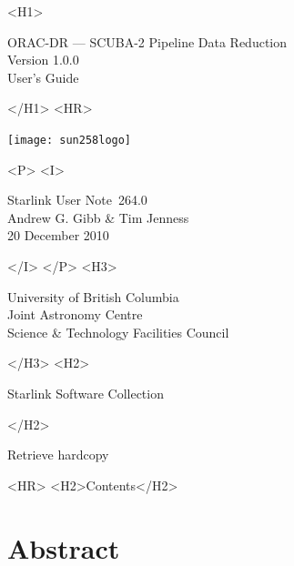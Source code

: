 \documentclass[twoside,11pt]{article}
\newcommand{\stardoccategory}  {Starlink User Note}
\newcommand{\stardocsource}    {sun\stardocnumber}
\newcommand{\stardocnumber}    {264.0}
\newcommand{\stardocauthors}   {Andrew G. Gibb \& Tim Jenness}
\newcommand{\stardocdate}      {20 December 2010}
\newcommand{\stardoctitle}     {ORAC-DR --- SCUBA-2 Pipeline Data Reduction}
\newcommand{\stardocversion}   {Version 1.0.0}
\newcommand{\stardocmanual}    {User's Guide}
\newcommand{\htmladdnormallink}[2]{#1}
\newcommand{\htmladdimg}[1]{}
\newcommand{\htmlref}[2]{#1}
\newcommand{\htmladdtonavigation}[1]{}
\newcommand{\xlabel}[1]{}
\renewcommand{\_}{\texttt{\symbol{95}}}
\begin{document}
\begin{htmlonly}
   \xlabel{}
   \begin{rawhtml} <H1> \end{rawhtml}
      \stardoctitle\\
      \stardocversion\\
      \stardocmanual
   \begin{rawhtml} </H1> <HR> \end{rawhtml}

\texttt{[image: sun258\_logo]}

   \begin{rawhtml} <P> <I> \end{rawhtml}
   \stardoccategory\ \stardocnumber \\
   \stardocauthors \\
   \stardocdate
   \begin{rawhtml} </I> </P> <H3> \end{rawhtml}
      \htmladdnormallink{University of British Columbia}
                        {http://www.ubc.ca} \\
      \htmladdnormallink{Joint Astronomy Centre}
                        {http://www.jach.hawaii.edu}\\
      \htmladdnormallink{Science \& Technology Facilities Council}
                        {http://www.stfc.ac.uk} \\
   \begin{rawhtml} </H3> <H2> \end{rawhtml}
      \htmladdnormallink{Starlink Software Collection}{http://starlink.jach.hawaii.edu/}
   \begin{rawhtml} </H2> \end{rawhtml}
   \htmladdnormallink{\htmladdimg{source.gif} Retrieve hardcopy}
      {http://starlink.jach.hawaii.edu/cgi-bin/hcserver?\stardocsource}\\

  \label{stardoccontents}
  \begin{rawhtml}
    <HR>
    <H2>Contents</H2>
  \end{rawhtml}
  \htmladdtonavigation{\htmlref{\htmladdimg{contents_motif.gif}}
        {stardoccontents}}

  \section{\xlabel{abstract}Abstract}
\end{htmlonly}
\end{document}
